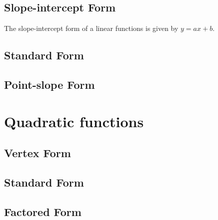 \documentclass[11pt]{article}
\begin{document}
	\subsection{Slope-intercept Form}
	The slope-intercept form of a linear functions is given by $y=ax+b$.
	\subsection{Standard Form}
	\subsection{Point-slope Form}
\section{Quadratic functions}
	\subsection{Vertex Form}
	\subsection{Standard Form}
	\subsection{Factored Form}
\end{document}
